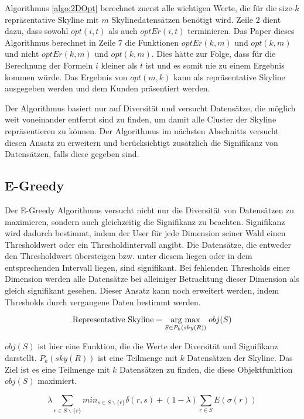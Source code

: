 Algorithmus \ref{algo:2DOpt} berechnet zuerst alle wichtigen Werte, die für die size-$k$ repräsentative Skyline mit $m$ Skylinedatensätzen benötigt wird. Zeile $2$ dient dazu, dass sowohl $opt(i,t)$ als auch $optEr(i,t)$ terminieren. Das Paper \cite{Tao:2009:DRS:1546683.1547325} dieses Algorithmus berechnet in Zeile $7$ die Funktionen $optEr(k,m)$ und $opt(k,m)$ und nicht $optEr(k,m)$ und $opt(k,m)$. Dies hätte zur Folge, dass für die Berechnung der Formeln $i$ kleiner als $t$ ist und es somit nie zu einem Ergebnis kommen würde.
Das Ergebnis von $opt(m,k)$ kann als repräsentative Skyline ausgegeben werden und dem Kunden präsentiert werden.

Der Algorithmus basiert nur auf Diversität und versucht Datensätze, die möglich weit voneinander entfernt sind zu finden, um damit alle Cluster der Skyline repräsentieren zu können. Der Algorithmus im nächsten Abschnitts versucht diesen Ansatz zu erweitern und berücksichtigt zusätzlich die Signifikanz von Datensätzen, falls diese gegeben sind.  
\subsection{E-Greedy}
\label{ch:Analyse:sec:repSkyAlgos:subsec:eGreedy}
Der E-Greedy Algorithmus \cite{magnani2014taking} versucht nicht nur die Diversität von Datensätzen zu maximieren, sondern auch gleichzeitig die Signifikanz zu beachten.
Signifikanz wird dadurch bestimmt, indem der User für jede Dimension seiner Wahl einen Thresholdwert oder ein Thresholdintervall angibt. Die Datensätze, die entweder den Thresholdwert übersteigen bzw. unter diesem liegen oder in dem entsprechenden Intervall liegen, sind signifikant. Bei fehlenden Thresholds einer Dimension werden alle Datensätze bei alleiniger Betrachtung dieser Dimension als gleich signifikant gesehen. Dieser Ansatz kann noch erweitert werden, indem Thresholds durch vergangene Daten bestimmt werden. 

$$\text{Representative Skyline} = \underset{S \in{P_k(sky(R))}}{\operatorname{arg}\,\operatorname{max}}\; obj(S)$$

$obj(S)$ ist hier eine Funktion, die die Werte der Diversität und Signifikanz darstellt. $P_k(sky(R))$ ist eine Teilmenge mit $k$ Datensätzen der Skyline. Das Ziel ist es eine Teilmenge mit $k$ Datensätzen zu finden, die diese Objektfunktion $obj(S)$ maximiert.

$$\lambda \sum\limits_{r \in{S \backslash \{r\}}} min_{s \in S \backslash \{r\}}\delta(r,s)+(1- \lambda) \sum\limits_{r \in{S}}E(\sigma(r))$$

